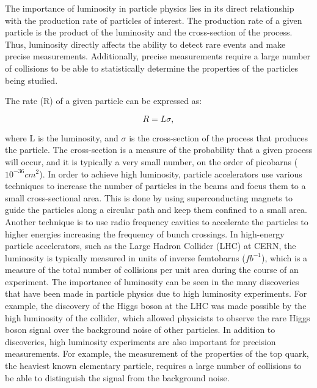 The importance of luminosity in particle physics lies in its direct relationship with the production rate of particles of interest. The production rate of a given particle is the product of the luminosity and the cross-section of the process. Thus, luminosity directly affects the ability to detect rare events and make precise measurements.
Additionally, precise measurements require a large number of collisions to be able to statistically determine the properties of the particles being studied.

The rate (R) of a given particle can be expressed as:

\begin{equation}
R = L  \sigma,
\end{equation}

where %
L is the luminosity, and $\sigma$ is the cross-section of the process that produces the particle. The cross-section is a measure of the probability that a given process will occur, and it is typically a very small number, on the order of picobarns ($10^{-36} cm^2$).
In order to achieve high luminosity, particle accelerators use various techniques to increase the number of particles in the beams and focus them to a small cross-sectional area. This is done by using superconducting magnets to guide the particles along a circular path and keep them confined to a small area. Another technique is to use radio frequency cavities to accelerate the particles to higher energies increasing the frequency of bunch crossings. In high-energy particle accelerators, such as the Large Hadron Collider (LHC) at CERN, the luminosity is typically measured in units of inverse femtobarns ($fb^{-1}$), which is a measure of the total number of collisions per unit area during the course of an experiment.
The importance of luminosity can be seen in the many discoveries that have been made in particle physics due to high luminosity experiments. For example, the discovery of the Higgs boson at the LHC was made possible by the high luminosity of the collider, which allowed physicists to observe the rare Higgs boson signal over the background noise of other particles. In addition to discoveries, high luminosity experiments are also important for precision measurements. For example, the measurement of the properties of the top quark, the heaviest known elementary particle, requires a large number of collisions to be able to distinguish the signal from the background noise.

